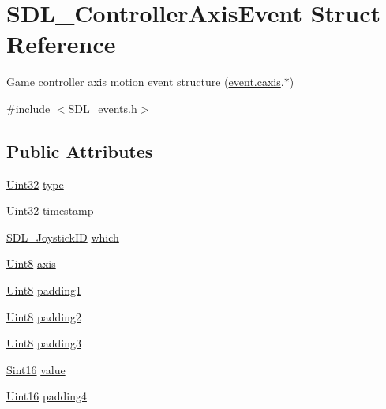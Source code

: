 \hypertarget{struct_s_d_l___controller_axis_event}{}\section{S\+D\+L\+\_\+\+Controller\+Axis\+Event Struct Reference}
\label{struct_s_d_l___controller_axis_event}


Game controller axis motion event structure (\hyperlink{union_s_d_l___event_aa8f6df0f2716fae56204b12ab4a4c289}{event.\+caxis}.$\ast$)  




{\ttfamily \#include $<$S\+D\+L\+\_\+events.\+h$>$}

\subsection*{Public Attributes}
\begin{DoxyCompactItemize}
\item 
\hyperlink{_s_d_l__stdinc_8h_add440eff171ea5f55cb00c4a9ab8672d}{Uint32} \hyperlink{struct_s_d_l___controller_axis_event_aa904b61e4763d28d887cf8afcc3cbb7c}{type}
\item 
\hyperlink{_s_d_l__stdinc_8h_add440eff171ea5f55cb00c4a9ab8672d}{Uint32} \hyperlink{struct_s_d_l___controller_axis_event_afc92dba0b4d1652a1ecf9e85606d1f14}{timestamp}
\item 
\hyperlink{_s_d_l__joystick_8h_a3c3d32500cb08f76ee8077983912c0bd}{S\+D\+L\+\_\+\+Joystick\+ID} \hyperlink{struct_s_d_l___controller_axis_event_a07087f68ea9d64b50047d65312ee7b94}{which}
\item 
\hyperlink{_s_d_l__stdinc_8h_a2944638813a090aa23e62f4da842c3e2}{Uint8} \hyperlink{struct_s_d_l___controller_axis_event_aba6543c143521aebce06a41a8cf79db0}{axis}
\item 
\hyperlink{_s_d_l__stdinc_8h_a2944638813a090aa23e62f4da842c3e2}{Uint8} \hyperlink{struct_s_d_l___controller_axis_event_af980495b1e24f9a868f2ccb25ce9629b}{padding1}
\item 
\hyperlink{_s_d_l__stdinc_8h_a2944638813a090aa23e62f4da842c3e2}{Uint8} \hyperlink{struct_s_d_l___controller_axis_event_a4a04fcd20a54db21c5258ab0e40c6ab5}{padding2}
\item 
\hyperlink{_s_d_l__stdinc_8h_a2944638813a090aa23e62f4da842c3e2}{Uint8} \hyperlink{struct_s_d_l___controller_axis_event_ab82598fe5621dca9b1a41f7b2ca1e9a0}{padding3}
\item 
\hyperlink{_s_d_l__stdinc_8h_a9d0257032c0e146ab6121bf0122712f5}{Sint16} \hyperlink{struct_s_d_l___controller_axis_event_a1ed7f14255ed01b982d40a38791d475a}{value}
\item 
\hyperlink{_s_d_l__stdinc_8h_a31fcc0a076c9068668173ee26d33e42b}{Uint16} \hyperlink{struct_s_d_l___controller_axis_event_ae0ad0f279b9978bbbac9f5b22ae8020b}{padding4}
\end{DoxyCompactItemize}


